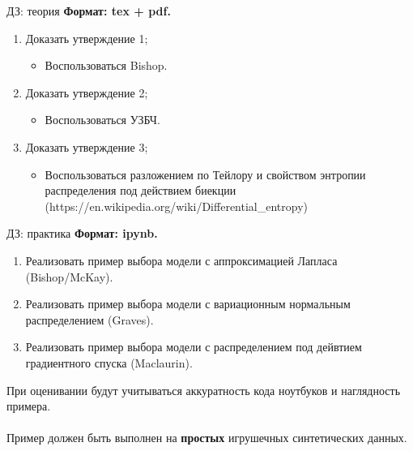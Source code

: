 \documentclass[usenames,dvipsnames,10pt,pdf,utf8,russian,aspectratio=43]{beamer}
\begin{document}
\begin{frame}{ДЗ: теория}
\textbf{Формат: tex + pdf.}

\begin{enumerate}
\item Доказать утверждение 1;
\begin{itemize}
\item Воспользоваться Bishop.
\end{itemize}

\item Доказать утверждение 2;
\begin{itemize}
\item Воспользоваться УЗБЧ.
\end{itemize}

\item Доказать утверждение 3;
\begin{itemize}
\item Воспользоваться разложением по Тейлору и свойством энтропии распределения под действием биекции (https://en.wikipedia.org/wiki/Differential\_entropy)
\end{itemize}
\end{enumerate}
\end{frame}

\begin{frame}{ДЗ: практика}
\textbf{Формат: ipynb.}

\begin{enumerate}
\item Реализовать пример выбора модели с аппроксимацией Лапласа (Bishop/McKay).

\item Реализовать пример выбора модели с вариационным нормальным распределением (Graves).

\item Реализовать пример выбора модели с распределением под дейвтием градиентного спуска (Maclaurin).
\end{enumerate}

При оценивании будут учитываться аккуратность кода ноутбуков и наглядность примера.\\~\\
Пример должен быть выполнен на  \textbf{простых} игрушечных синтетических данных.
\end{frame}
\end{document}
